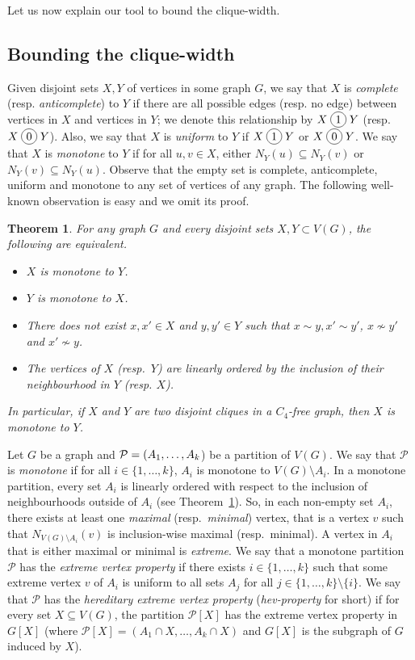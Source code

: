 \documentclass[12pt]{article}
\newcommand*\circled[1]{\tikz[baseline=(char.base)]{
		\node[shape=circle,draw,inner sep=2pt] (char) {#1};}}
\newtheorem{Theorem}{Theorem}[section]
\newcommand{\join}{\; \circled{1} \;}
\newcommand{\cojoin}{\; \circled{0} \;}
\begin{document}
	Let us now explain our tool to bound the clique-width. 
	
	\subsection*{Bounding the clique-width}
	
	Given disjoint  sets $X,Y$ of vertices in some graph $G$, we say that $X$ is {\it complete} (resp. {\it anticomplete}) to $Y$ if there are all possible edges (resp. no edge) between vertices in $X$ and vertices in $Y$; we denote this relationship by $X\join Y$ (resp. $X\cojoin Y$).  
	Also, we say that $X$ is {\it uniform} to $Y$ if $X \join Y$ or $X \cojoin Y$.   
	We say that $X$ is {\it monotone} to $Y$ if for all $u, v\in X$, either $N_Y(u) \subseteq N_Y(v)$ or $N_Y(v) \subseteq N_Y(u)$. Observe that the empty set is complete, anticomplete, uniform and monotone to any set of vertices of any graph. 
	The following well-known observation is easy and we omit its proof. 
	
	\begin{Theorem}\label{th:monotone}
		For any graph $G$ and every disjoint sets $X, Y \subset V(G)$, the following are equivalent.
		\begin{itemize}
			\item $X$ is monotone to $Y$.
			\item $Y$ is monotone to $X$.
			\item There does not exist $x, x' \in X$ and $y, y'\in Y$ such that $x\sim y, x'\sim y'$, $x\not\sim y'$ and $x' \not\sim y$. 
			\item The vertices of $X$ (resp.\ $Y$) are linearly ordered by the inclusion of their neighbourhood in $Y$ (resp. $X$). 
		\end{itemize}
		
		In particular, if $X$ and $Y$ are two disjoint cliques in a $C_4$-free graph, then $X$ is  monotone to $Y$. 
	\end{Theorem}
	
	
	
	Let $G$ be a graph and ${\cal P} = (A_1, \ldots, A_k$) be a partition of $V(G)$. 
	We say that $\mathcal P$ is \emph{monotone} if for all $i\in \{1, \dots, k\}$, $A_i$ is monotone to $V(G) \setminus A_i$.  
	In a monotone partition, every set $A_i$ is linearly ordered with respect to the inclusion of neighbourhoods outside of $A_i$ (see Theorem~\ref{th:monotone}). So, in each non-empty set $A_i$, there exists at least one \emph{maximal} (resp.\ \emph{minimal}) vertex, that is a vertex $v$ such that $N_{V(G) \setminus A_i}(v)$ is inclusion-wise maximal (resp.\ minimal). 
	A vertex in $A_i$ that is either maximal or minimal is \emph{extreme}. 
	We say that a monotone partition $\mathcal P$ has the \emph{extreme vertex property} if there exists $i\in \{1, \dots, k\}$ such that some extreme vertex $v$ of $A_i$ is uniform to all sets $A_j$ for all $j\in \{1, \dots, k\} \setminus \{i\}$. 
	We say that $\mathcal P$ has the \emph{hereditary extreme vertex property} (\emph{hev-property} for short) if for every set $X\subseteq V(G)$, the partition $\mathcal P[X]$ has the extreme vertex property in $G[X]$ (where $\mathcal P[X] = (A_1\cap X, \dots, A_k \cap X)$ and $G[X]$ is the subgraph of $G$ induced by $X$). 
	
\end{document}
